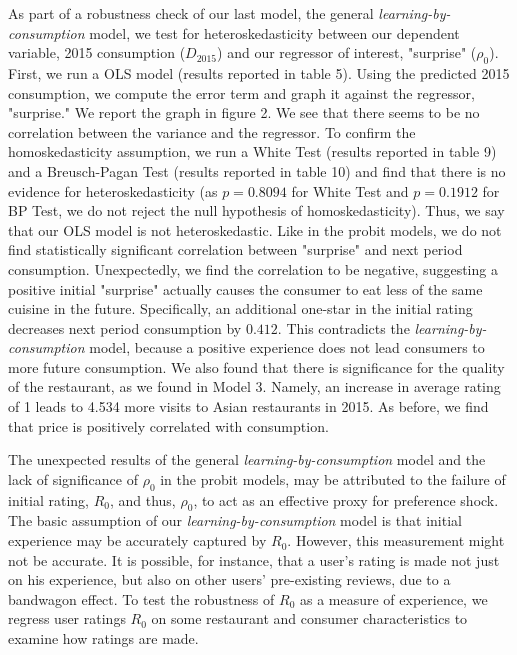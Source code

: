 \documentclass[Journal,letterpaper, NoLineNumbers]{ascelike-new}
\begin{document}
As part of a robustness check of our last model, the general \textit{learning-by-consumption} model, we test for heteroskedasticity between our dependent variable, 2015 consumption ($D_{2015}$) and our regressor of interest, "surprise" ($\rho_0$). First, we run a OLS model (results reported in table 5). Using the predicted 2015 consumption, we compute the error term and graph it against the regressor, "surprise." We report the graph in figure 2. We see that there seems to be no correlation between the variance and the regressor. To confirm the homoskedasticity assumption, we run a White Test (results reported in table 9) and a Breusch-Pagan Test (results reported in table 10) and find that there is no evidence for heteroskedasticity (as $p = 0.8094$ for White Test and $p = 0.1912$ for BP Test, we do not reject the null hypothesis of homoskedasticity). Thus, we say that our OLS model is not heteroskedastic. Like in the probit models, we do not find statistically significant correlation between "surprise" and next period consumption. Unexpectedly, we find the correlation to be negative, suggesting a positive initial "surprise" actually causes the consumer to eat less of the same cuisine in the future. Specifically, an additional one-star in the initial rating decreases next period consumption by $0.412$. This contradicts the \textit{learning-by-consumption} model, because a positive experience does not lead consumers to more future consumption. We also found that there is significance for the quality of the restaurant, as we found in Model 3. Namely, an increase in average rating of 1 leads to 4.534 more visits to Asian restaurants in 2015. As before, we find that price is positively correlated with consumption.   

The unexpected results of the general \textit{learning-by-consumption} model and the lack of significance of $\rho_0$ in the probit models, may be attributed to the failure of initial rating, $R_0$, and thus, $\rho_0$, to act as an effective proxy for preference shock. The basic assumption of our \textit{learning-by-consumption} model is that initial experience may be accurately captured by $R_0$. However, this measurement might not be accurate. It is possible, for instance, that a user's rating is made not just on his experience, but also on other users' pre-existing reviews, due to a bandwagon effect. To test the robustness of $R_0$ as a measure of experience, we regress user ratings $R_0$ on some restaurant and consumer characteristics to examine how ratings are made. 
\end{document}
